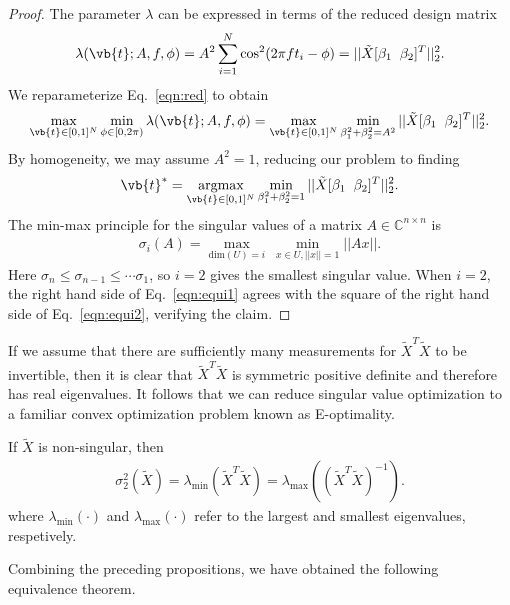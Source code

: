 \begin{proof}
The parameter $\lambda$  can be expressed in terms of the reduced design matrix 
\begin{align}
    \lambda(\vb{t};A,f,\phi) = A^2 \sum_{i=1}^{N} \cos^2(2\pi f t_i -\phi ) =  ||\tilde{X} [\beta_1 \;\; \beta_2]^T ||_2^2. \label{eqn:red}
\end{align}
We reparameterize Eq.~\eqref{eqn:red} to obtain
\begin{align*}
   \max_{\vb{t} \in [0,1]^N} \min_{\phi \in [0,2\pi)}   \lambda(\vb{t};A,f,\phi)  =    \max_{\vb{t} \in [0,1]^N} \min_{\beta_1 ^2 + \beta_2^2 =A^2}  ||\tilde{X} [\beta_1 \;\; \beta_2]^T ||_2^2.
\end{align*}
By homogeneity, we may assume $A^2=1$, reducing our problem to finding 
\begin{align}
    \vb{t}^* = \underset{\vb{t} \in [0,1]^{N}}{\textrm{argmax}} \min_{\beta_1 ^2 + \beta_2^2 =1}  ||\tilde{X} [\beta_1 \;\; \beta_2]^T ||_2^2.\label{eqn:equi1}
\end{align}
The min-max principle for the singular values of a matrix $A \in \mathbb{C}^{n\times n}$ is 
\begin{align}
    \sigma_{i}(A) = \max_{\mathrm{dim}(U)= i } ~ \min_{x\in U, ||x||=1} ||Ax||\label{eqn:equi2}.
\end{align}
Here $\sigma_n \leq \sigma_{n-1} \leq \cdots \sigma_1$, so $i=2$ gives the smallest singular value. When $i=2$, the right hand side of Eq.~\eqref{eqn:equi1} agrees with the square of the right hand side of Eq.~\eqref{eqn:equi2}, verifying the claim.
\end{proof}
If we assume that there are sufficiently many measurements for $\tilde{X}^T\tilde{X}$ to be invertible, then it is clear that $\tilde{X}^T \tilde{X}$ is symmetric positive definite and therefore has real eigenvalues. It follows that we can reduce singular value optimization to a familiar convex optimization problem known as E-optimality.
\begin{corollary}
    If $\tilde{X}$ is non-singular, then 
    \begin{align}
        \sigma_2^2(\tilde{X}) = \lambda_{\mathrm{min}}(\tilde{X}^T \tilde{X}) = \lambda_{\mathrm{max}}((\tilde{X}^T \tilde{X})^{-1}).
    \end{align}
where $\lambda_{\textrm{min}} ( \cdot )$ and $\lambda_{\textrm{max}} ( \cdot )$ refer to the largest and smallest eigenvalues, respetively.
\end{corollary}
Combining the preceding propositions, we have obtained the following equivalence theorem.
